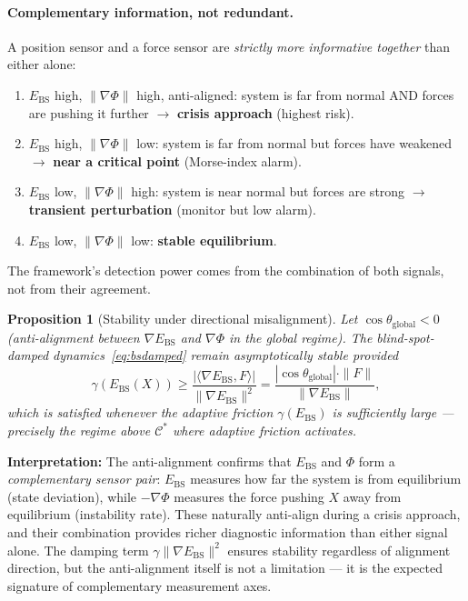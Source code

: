 \documentclass[11pt,a4paper]{article}
\newcommand{\Ebs}{E_{\mathrm{BS}}}
\newcommand{\Cman}{\mathcal{C}^*}
\newcommand{\grad}{\nabla}
\newtheorem{proposition}[theorem]{Proposition}
\begin{document}
\paragraph{Complementary information, not redundant.}
A position sensor and a force sensor are \emph{strictly more
informative together} than either alone:
\begin{enumerate}[nosep]
  \item $\Ebs$ high, $\|\grad\Phi\|$ high, anti-aligned:
    system is far from normal AND forces are pushing it further
    $\to$ \textbf{crisis approach} (highest risk).
  \item $\Ebs$ high, $\|\grad\Phi\|$ low:
    system is far from normal but forces have weakened
    $\to$ \textbf{near a critical point} (Morse-index alarm).
  \item $\Ebs$ low, $\|\grad\Phi\|$ high:
    system is near normal but forces are strong
    $\to$ \textbf{transient perturbation} (monitor but low alarm).
  \item $\Ebs$ low, $\|\grad\Phi\|$ low:
    \textbf{stable equilibrium}.
\end{enumerate}
The framework's detection power comes from the combination
of both signals, not from their agreement.

\begin{proposition}[Stability under directional misalignment]
\label{prop:antialign}
Let $\cos\theta_{\mathrm{global}} < 0$ (anti-alignment between
$\grad\Ebs$ and $\grad\Phi$ in the global regime).  The
blind-spot-damped dynamics~\eqref{eq:bsdamped} remain
asymptotically stable provided
\begin{equation}\label{eq:damping_dominance}
  \gamma(\Ebs(X)) \ge
    \frac{|\langle\grad\Ebs, F\rangle|}{\|\grad\Ebs\|^2}
    = \frac{|\cos\theta_{\mathrm{global}}|\cdot\|F\|}{\|\grad\Ebs\|},
\end{equation}
which is satisfied whenever the adaptive friction $\gamma(\Ebs)$
is sufficiently large --- precisely the regime above $\Cman$ where
adaptive friction activates.
\end{proposition}

\noindent
\textbf{Interpretation:} The anti-alignment confirms that $\Ebs$
and $\Phi$ form a \emph{complementary sensor pair}: $\Ebs$
measures how far the system is from equilibrium (state deviation),
while $-\grad\Phi$ measures the force pushing $X$ away from
equilibrium (instability rate).  These naturally anti-align during
a crisis approach, and their combination provides richer
diagnostic information than either signal alone.  The damping term
$\gamma\|\grad\Ebs\|^2$ ensures stability regardless of
alignment direction, but the anti-alignment itself is not a
limitation --- it is the expected signature of complementary
measurement axes.
\end{document}
